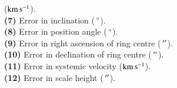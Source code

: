 \documentclass[oldversion]{aa}
\renewcommand{\deg}{\hbox{$^\circ$}}
\begin{document}
(${\rm km}\,{\rm s}^{-1}$).\\ {\bf (7)} Error in inclination
($\,\deg$).\\ {\bf (8)} Error in position angle ($\,\deg$).\\ {\bf
(9)} Error in right ascension of ring centre ($\,\hbox{$^{\prime\prime}$}$).\\ {\bf
(10)} Error in declination of ring centre ($\,\hbox{$^{\prime\prime}$}$).\\ {\bf (11)}
Error in systemic velocity (${\rm km}\,{\rm s}^{-1}$).\\ {\bf (12)}
Error in scale height ($\,\hbox{$^{\prime\prime}$}$).

\clearpage

\clearpage

\clearpage

\clearpage

\clearpage

\clearpage

\clearpage

\clearpage

\clearpage

\clearpage

\clearpage

\clearpage

\clearpage

\clearpage

\clearpage

\end{document}
